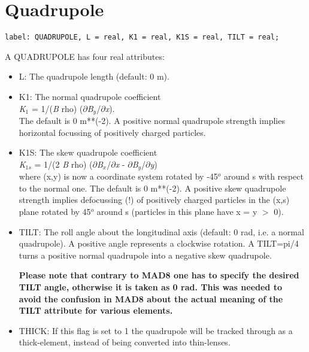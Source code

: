 
\section{Quadrupole}

\begin{verbatim}
label: QUADRUPOLE, L = real, K1 = real, K1S = real, TILT = real;
\end{verbatim}    

A QUADRUPOLE has four real attributes:     
\begin{itemize}
   \item L: The quadrupole length (default: 0 m). 
   \item K1: The normal quadrupole coefficient \\        
     \textit{K}$_1$ = 1/(\textit{B} rho) ($\partial$\textit{B$_y$}/$\partial$\textit{x}).\\ 
     The default is 0 m**(-2). A positive normal quadrupole strength
     implies horizontal focussing of positively charged particles.  
   \item K1S: The skew quadrupole coefficient \\        
     \textit{K}$_{1s}$ = 1/(2 \textit{B} rho)
     ($\partial$\textit{B$_x$}/$\partial$\textit{x} -
     $\partial$\textit{B$_y$}/$\partial$\textit{y})\\  
     where (x,y) is now a coordinate system rotated by -45$^o$ around s
     with respect to the normal one. The default is 0  m**(-2). A
     positive skew quadrupole strength implies defocussing (!) of
     positively charged particles in the (x,s) plane rotated by 45$^o$
     around s (particles in this plane have x = y $>$ 0). 
   \item TILT: The roll angle about the longitudinal axis (default: 0
     rad, i.e. a normal quadrupole). A positive angle represents a
     clockwise rotation. A TILT=pi/4 turns a positive normal quadrupole
     into a negative skew quadrupole.          

\textbf{ Please note that contrary to MAD8 one has to
  specify the desired TILT angle, otherwise it is taken as
  0 rad. This was needed to avoid the confusion in MAD8
  about the actual meaning of the TILT attribute for
  various elements. } 

    \item THICK: If this flag is set to 1 the quadrupole will be tracked
      through as a thick-element, instead of being converted into
      thin-lenses.  
\end{itemize}


